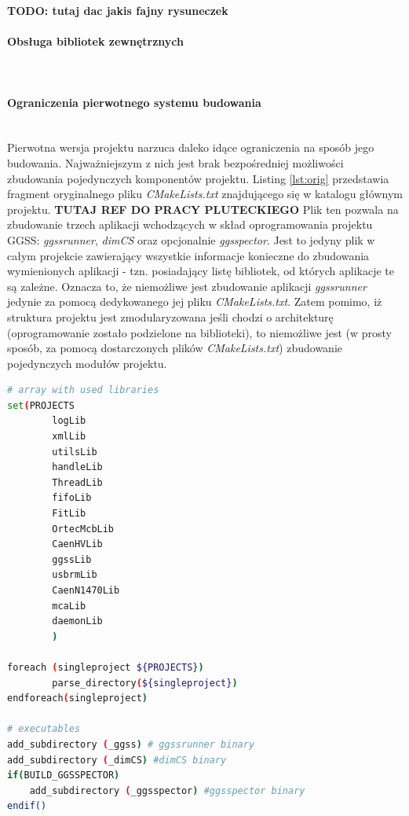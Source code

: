 \textbf{TODO: tutaj dac jakis fajny rysuneczek}












\paragraph*{Obsługa bibliotek zewnętrznych}\mbox{}\\



\paragraph*{Ograniczenia pierwotnego systemu budowania}\mbox{}\\
Pierwotna wersja projektu narzuca daleko idące ograniczenia na sposób jego budowania. Najważniejszym z nich jest brak bezpośredniej możliwości zbudowania pojedynczych komponentów projektu. Listing \ref{lst:orig} przedstawia fragment oryginalnego pliku \textit{CMakeLists.txt} znajdującego się w katalogu głównym projektu. \textbf{TUTAJ REF DO PRACY PLUTECKIEGO} Plik ten pozwala na zbudowanie trzech aplikacji wchodzących w skład oprogramowania projektu GGSS: \textit{ggssrunner}, \textit{dimCS} oraz opcjonalnie \textit{ggsspector}. Jest to jedyny plik w całym projekcie zawierający wszystkie informacje konieczne do zbudowania wymienionych aplikacji - tzn. posiadający listę bibliotek, od których aplikacje te są zależne. Oznacza to, że niemożliwe jest zbudowanie aplikacji \textit{ggssrunner} jedynie za pomocą dedykowanego jej pliku \textit{CMakeLists.txt}. Zatem pomimo, iż struktura projektu jest zmodularyzowana jeśli chodzi o architekturę (oprogramowanie zostało podzielone na biblioteki), to niemożliwe jest (w prosty sposób, za pomocą dostarczonych plików \textit{CMakeLists.txt}) zbudowanie pojedynczych modułów projektu.

\begin{lstlisting}[language=bash, caption={Fragment oryginalnego pliku CMakeLists.txt znajdującego się w katalogu głównym pierwotnej wersji projektu}, label={lst:orig}]
# array with used libraries
set(PROJECTS
        logLib
        xmlLib
        utilsLib
        handleLib
        ThreadLib
        fifoLib
        FitLib
        OrtecMcbLib
        CaenHVLib
        ggssLib
        usbrmLib
        CaenN1470Lib
        mcaLib
        daemonLib
        )

foreach (singleproject ${PROJECTS})
        parse_directory(${singleproject})
endforeach(singleproject)

# executables
add_subdirectory (_ggss) # ggssrunner binary
add_subdirectory (_dimCS) #dimCS binary
if(BUILD_GGSSPECTOR)
    add_subdirectory (_ggsspector) #ggsspector binary
endif()
\end{lstlisting}

